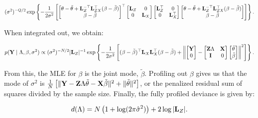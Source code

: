 \documentclass[10pt]{article}
\begin{document}
\begin{equation*}
(\sigma^2)^{-Q/2}\exp\left\{-\frac{1}{2\sigma^2}\left[
\begin{bmatrix}\theta-\tilde{\theta} + {\bf L}_Z^{-\top}{\bf
    L}_{ZX}^\top (\beta - \tilde\beta) \\ \beta -
  \tilde\beta\end{bmatrix}^\top
\begin{bmatrix}
{\bf L}_Z & 0 \\ 0 & {\bf L}_X \end{bmatrix}
\begin{bmatrix}
{\bf L}_Z^\top &0 \\ 0 & {\bf L}_X^\top \end{bmatrix}
\begin{bmatrix}\theta-\tilde{\theta} + {\bf L}_Z^{-\top}{\bf
    L}_{ZX}^\top (\beta - \tilde\beta) \\ \beta -
  \tilde\beta\end{bmatrix}
\right]\right\}. \\
\end{equation*}

When integrated out, we obtain:

\begin{equation*}
p({\bf Y} \mid \Lambda, \beta, \sigma^2) \propto (\sigma^2)^{-N/2}|{\bf
  L}_Z|^{-1}
\exp\left\{-\frac{1}{2\sigma^2}\left[
(\beta - \tilde\beta)^\top{\bf L}_X {\bf L}_X^\top(\beta - \tilde\beta) +
\left\|
\begin{bmatrix} {\bf Y} \\ 0 \end{bmatrix}
-\begin{bmatrix}{\bf Z}\Lambda & {\bf X} \\ {\bf I} & 0 \end{bmatrix}
\begin{bmatrix}\tilde\theta \\ \tilde\beta\end{bmatrix}
\right\|^2
\right]\right\}.
\end{equation*}

From this, the MLE for $\beta$ is the joint mode,
$\tilde\beta$. Profiling out $\beta$ gives us that the
mode of $\sigma^2$ is $\frac{1}{N}\left[\|{\bf Y} - {\bf
  Z}\Lambda\tilde\theta - {\bf X}\tilde\beta\|^2 +
\|\tilde\theta\|^2\right]$, or the penalized residual sum of
squares divided by the sample size. Finally, the fully profiled deviance is given by:

\begin{equation*}
d(\Lambda) = N\left(1 + \log(2\pi\hat\sigma^2)\right)+2\log|{\bf L}_Z|.
\end{equation*}
\end{document}
